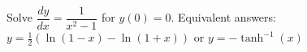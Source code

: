 {Solve $\dfrac{dy}{dx} = \dfrac{1}{x^2-1}$ for $y(0)=0$.}
{Equivalent answers: $y = \frac{1}{2}(\ln(1-x)-\ln(1+x))$ or $y=-\tanh^{-1}(x)$}